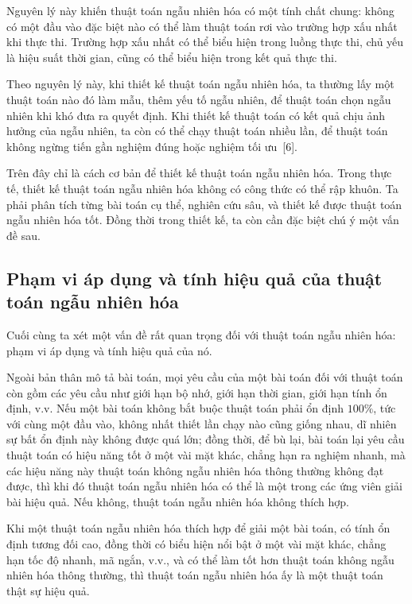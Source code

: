 \documentclass[11pt]{article}
\begin{document}
Nguyên lý này khiến thuật toán ngẫu nhiên hóa có một tính chất chung: không có
một đầu vào đặc biệt nào có thể làm thuật toán rơi vào trường hợp xấu nhất khi
thực thi. Trường hợp xấu nhất có thể biểu hiện trong luồng thực thi, chủ yếu
là hiệu suất thời gian, cũng có thể biểu hiện trong kết quả thực thi.

Theo nguyên lý này, khi thiết kế thuật toán ngẫu nhiên hóa, ta thường lấy một
thuật toán nào đó làm mẫu, thêm yếu tố ngẫu nhiên, để thuật toán chọn ngẫu
nhiên khi khó đưa ra quyết định. Khi thiết kế thuật toán có kết quả chịu ảnh
hưởng của ngẫu nhiên, ta còn có thể chạy thuật toán nhiều lần, để thuật toán
không ngừng tiến gần nghiệm đúng hoặc nghiệm tối ưu~[6].

Trên đây chỉ là cách cơ bản để thiết kế thuật toán ngẫu nhiên hóa. Trong thực
tế, thiết kế thuật toán ngẫu nhiên hóa không có công thức có thể rập khuôn.
Ta phải phân tích từng bài toán cụ thể, nghiên cứu sâu, và thiết kế được thuật
toán ngẫu nhiên hóa tốt. Đồng thời trong thiết kế, ta còn cần đặc biệt chú ý
một vấn đề sau.

\subsection{Phạm vi áp dụng và tính hiệu quả của thuật toán ngẫu nhiên hóa}

Cuối cùng ta xét một vấn đề rất quan trọng đối với thuật toán ngẫu nhiên hóa:
phạm vi áp dụng và tính hiệu quả của nó.

Ngoài bản thân mô tả bài toán, mọi yêu cầu của một bài toán đối với thuật toán
còn gồm các yêu cầu như giới hạn bộ nhớ, giới hạn thời gian, giới hạn tính ổn
định, v.v. Nếu một bài toán không bắt buộc thuật toán phải ổn định \(100\%\),
tức với cùng một đầu vào, không nhất thiết lần chạy nào cũng giống nhau, dĩ
nhiên sự bất ổn định này không được quá lớn; đồng thời, để bù lại, bài toán
lại yêu cầu thuật toán có hiệu năng tốt ở một vài mặt khác, chẳng hạn ra
nghiệm nhanh, mà các hiệu năng này thuật toán không ngẫu nhiên hóa thông
thường không đạt được, thì khi đó thuật toán ngẫu nhiên hóa có thể là một
trong các ứng viên giải bài hiệu quả. Nếu không, thuật toán ngẫu nhiên hóa
không thích hợp.

Khi một thuật toán ngẫu nhiên hóa thích hợp để giải một bài toán, có tính ổn
định tương đối cao, đồng thời có biểu hiện nổi bật ở một vài mặt khác, chẳng
hạn tốc độ nhanh, mã ngắn, v.v., và có thể làm tốt hơn thuật toán không ngẫu
nhiên hóa thông thường, thì thuật toán ngẫu nhiên hóa ấy là một thuật toán
thật sự hiệu quả.
\end{document}

